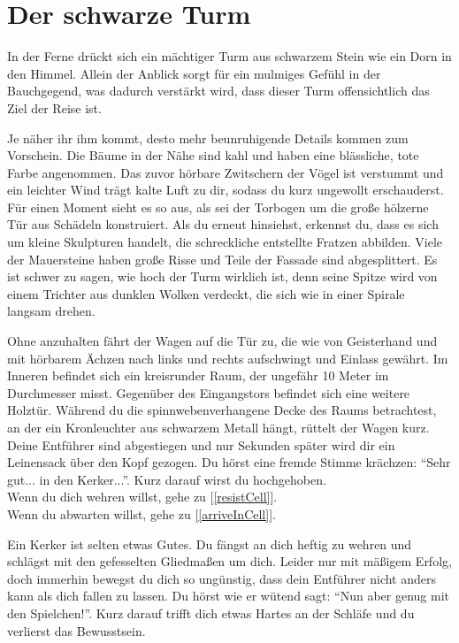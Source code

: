 \chapter*{Der schwarze Turm}


In der Ferne drückt sich ein mächtiger Turm aus schwarzem Stein wie ein Dorn in den Himmel. Allein der Anblick sorgt für ein mulmiges Gefühl in der Bauchgegend, was dadurch verstärkt wird, dass dieser Turm offensichtlich das Ziel der Reise ist.

Je näher ihr ihm kommt, desto mehr beunruhigende Details kommen zum Vorschein. Die Bäume in der Nähe sind kahl und haben eine blässliche, tote Farbe angenommen. Das zuvor hörbare Zwitschern der Vögel ist verstummt und ein leichter Wind trägt kalte Luft zu dir, sodass du kurz ungewollt erschauderst. Für einen Moment sieht es so aus, als sei der Torbogen um die große hölzerne Tür aus Schädeln konstruiert. Als du erneut hinsiehst, erkennst du, dass es sich um kleine Skulpturen handelt, die schreckliche entstellte Fratzen abbilden. Viele der Mauersteine haben große Risse und Teile der Fassade sind abgesplittert.
Es ist schwer zu sagen, wie hoch der Turm wirklich ist, denn seine Spitze wird von einem Trichter aus dunklen Wolken verdeckt, die sich wie in einer Spirale langsam drehen.

Ohne anzuhalten fährt der Wagen auf die Tür zu, die wie von Geisterhand und mit hörbarem Ächzen nach links und rechts aufschwingt und Einlass gewährt. Im Inneren befindet sich ein kreisrunder Raum, der ungefähr 10 Meter im Durchmesser misst. Gegenüber des Eingangstors befindet sich eine weitere Holztür. Während du die spinnwebenverhangene Decke des Raums betrachtest, an der ein Kronleuchter aus schwarzem Metall hängt, rüttelt der Wagen kurz. Deine Entführer sind abgestiegen und nur Sekunden später wird dir ein Leinensack über den Kopf gezogen. Du hörst eine fremde Stimme krächzen: ``Sehr gut... in den Kerker...''. Kurz darauf wirst du hochgehoben.
\\Wenn du dich wehren willst, gehe zu [\ref{resistCell}].
\\Wenn du abwarten willst, gehe zu [\ref{arriveInCell}].


Ein Kerker ist selten etwas Gutes. Du fängst an dich heftig zu wehren und schlägst mit den gefesselten Gliedmaßen um dich. Leider nur mit mäßigem Erfolg, doch immerhin bewegst du dich so ungünstig, dass dein Entführer nicht anders kann als dich fallen zu lassen. Du hörst wie er wütend sagt: ``Nun aber genug mit den Spielchen!''. Kurz darauf trifft dich etwas Hartes an der Schläfe und du verlierst das Bewusstsein.

